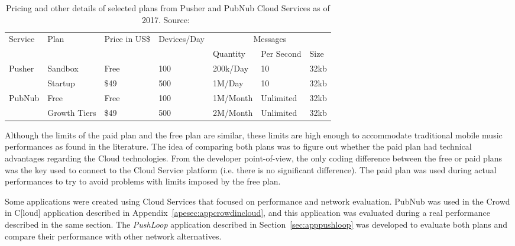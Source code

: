 \begin{table}[]
\centering
\caption{Pricing and other details of selected plans from Pusher and PubNub Cloud Services as of 2017. Source:~\cite{Pusher2017website,PubNub2017website}}
\label{tab:pusherpubnubplans}
\begin{tabular}{l|llllll}
Service & Plan         & Price in US\$ & Devices/Day & \multicolumn{3}{c}{Messages} \\ \cline{5-7} 
        &              &               &             & Quantity & Per Second & Size \\ \hline
Pusher  & Sandbox      & Free          & 100         & 200k/Day &    10      & 32kb \\ \cline{2-7} 
        & Startup      & \$49          & 500         & 1M/Day   &    10      & 32kb \\ \hline
PubNub  & Free         & Free          & 100         & 1M/Month & Unlimited  & 32kb \\ \cline{2-7} 
        & Growth Tiers & \$49          & 500         & 2M/Month & Unlimited  & 32kb \\ \hline
\end{tabular}
\end{table}

Although the limits of the paid plan and the free plan are similar, these limits are high enough to accommodate traditional mobile music performances as found in the literature. 
The idea of comparing both plans was to figure out whether the paid plan had technical advantages regarding the Cloud technologies.
From the developer point-of-view, the only coding difference between the free or paid plans was the key used to connect to the Cloud Service platform (i.e. there is no significant difference).
The paid plan was used during actual performances to try to avoid problems with limits imposed by the free plan.

Some applications were created using Cloud Services that focused on performance and network evaluation.
PubNub was used in the Crowd in C[loud] application described in Appendix~\ref{apesec:appcrowdincloud}, and this application was evaluated during a real performance described in the same section.
The \textit{PushLoop} application described in Section~\ref{sec:apppushloop} was developed to evaluate both plans and compare their performance with other network alternatives.

